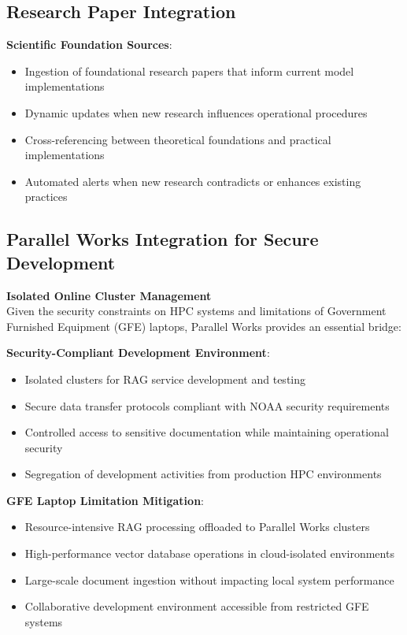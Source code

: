 \documentclass[11pt,letterpaper]{article}
\begin{document}
\subsection{Research Paper Integration}
\textbf{Scientific Foundation Sources}:
\begin{itemize}
    \item Ingestion of foundational research papers that inform current model implementations
    \item Dynamic updates when new research influences operational procedures
    \item Cross-referencing between theoretical foundations and practical implementations
    \item Automated alerts when new research contradicts or enhances existing practices
\end{itemize}

\subsection{Parallel Works Integration for Secure Development}

\textbf{Isolated Online Cluster Management}\\
Given the security constraints on HPC systems and limitations of Government Furnished Equipment (GFE) laptops, Parallel Works provides an essential bridge:

\begin{center}
\end{center}

\textbf{Security-Compliant Development Environment}:
\begin{itemize}
    \item Isolated clusters for RAG service development and testing
    \item Secure data transfer protocols compliant with NOAA security requirements
    \item Controlled access to sensitive documentation while maintaining operational security
    \item Segregation of development activities from production HPC environments
\end{itemize}

\textbf{GFE Laptop Limitation Mitigation}:
\begin{itemize}
    \item Resource-intensive RAG processing offloaded to Parallel Works clusters
    \item High-performance vector database operations in cloud-isolated environments
    \item Large-scale document ingestion without impacting local system performance
    \item Collaborative development environment accessible from restricted GFE systems
\end{itemize}
\end{document}

